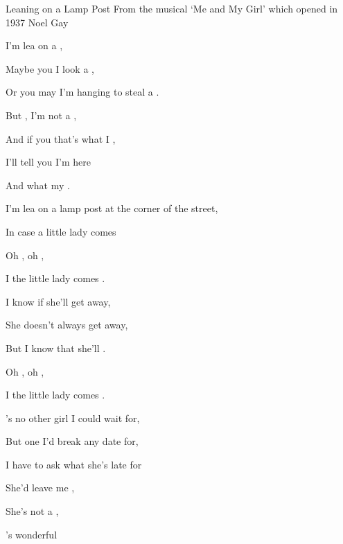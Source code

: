 \begin{SBSong}{Leaning on a Lamp Post}
  {From the musical `Me and My Girl' which opened in 1937}
  {Noel Gay}
  \begin{SBVerse}
    I'm lea on a ,

    Maybe you  I look a ,

    Or you may  I'm hanging  to steal a .

    But , I'm not a ,

    And if you  that's what I ,

    I'll tell you  I'm here

    And what my  . 
  \end{SBVerse}
  \begin{SBVerse}
    I'm lea on a lamp post at the corner of the street,

    In case a  little lady comes 

    Oh , oh ,

    I  the little lady comes .

    I  know if she'll get away,

    She doesn't always get away,

    But  I know that she'll .

    Oh , oh ,

    I  the little lady comes .
  \end{SBVerse}  
  \CBPageBrk
  \begin{SBVerse}
    's no other girl I could wait for,

    But  one I'd break any date for,
    
    I  have to ask what she's late for

    She'd   leave me , 

    She's not a     ,

    's  wonderful


\end{SBVerse}
\end{SBSong}
